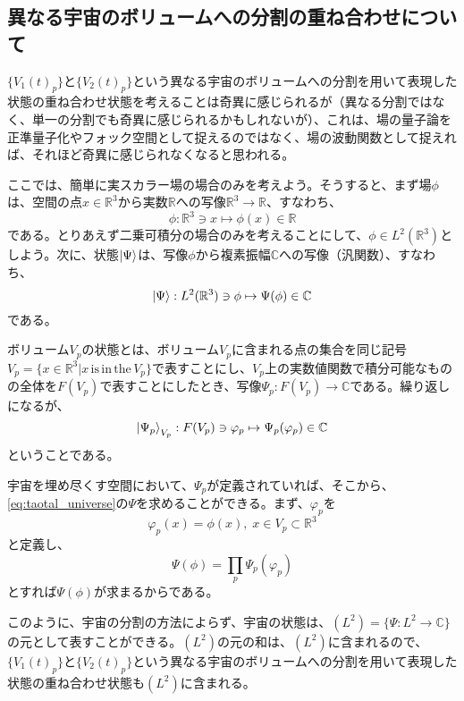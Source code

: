 \subsection{異なる宇宙のボリュームへの分割の重ね合わせについて}
$\{V_1(t)_p\}$と$\{V_2(t)_p\}$という異なる宇宙のボリュームへの分割を用いて表現した状態の重ね合わせ状態を考えることは奇異に感じられるが（異なる分割ではなく、単一の分割でも奇異に感じられるかもしれないが）、これは、場の量子論を正準量子化やフォック空間として捉えるのではなく、場の波動関数として捉えれば、それほど奇異に感じられなくなると思われる。\par
ここでは、簡単に実スカラー場の場合のみを考えよう。そうすると、まず場$\phi$は、空間の点$x \in \mathbb{R}^3$から実数$\mathbb{R}$への写像$\mathbb{R}^3 \to \mathbb{R}$、すなわち、
\begin{equation}
    \phi : \mathbb{R}^3 \ni x \mapsto \phi (x) \in \mathbb{R}
\end{equation}
である。とりあえず二乗可積分の場合のみを考えることにして、$\phi \in L^2(\mathbb{R}^3)$としよう。次に、状態$\ket{\Psi}$は、写像$\phi$から複素振幅$\mathbb{C}$への写像（汎関数）、すなわち、
\begin{equation}
    \label{eq:taotal_universe}
    \ket{\Psi} :  L^2(\mathbb{R}^3) \ni \phi \mapsto \Psi (\phi) \in \mathbb{C}
\end{equation}
である。\par
ボリューム$V_p$の状態とは、ボリューム$V_p$に含まれる点の集合を同じ記号$V_p=\{x \in \mathbb{R}^3 | x \mathrm{\, is\, in\, the\, }V_p\}$で表すことにし、$V_p$上の実数値関数で積分可能なものの全体を$F(V_p)$で表すことにしたとき、写像$\Psi_p : F(V_p) \to \mathbb{C}$である。繰り返しになるが、
\begin{equation}
    \ket{\Psi_p}_{V_p} :  F(V_p) \ni \varphi_p \mapsto \Psi_p (\varphi_p) \in \mathbb{C}
\end{equation}
ということである。\par
宇宙を埋め尽くす空間において、$\Psi_p$が定義されていれば、そこから、\eqref{eq:taotal_universe}の$\Psi$を求めることができる。まず、$\varphi_p$を
\begin{equation}
     \varphi_p(x) = \phi(x),\; x \in V_p \subset \mathbb{R}^3
\end{equation}
と定義し、
\begin{equation}
    \label{eq:universe_wavefunction}
    \Psi (\phi) = \prod_p \Psi_p(\varphi_p)
\end{equation}
とすれば$\Psi (\phi)$が求まるからである。\par
このように、宇宙の分割の方法によらず、宇宙の状態は、$(L^2) = \{\Psi : L^2 \to \mathbb{C}\}$の元として表すことができる。$(L^2)$の元の和は、$(L^2)$に含まれるので、$\{V_1(t)_p\}$と$\{V_2(t)_p\}$という異なる宇宙のボリュームへの分割を用いて表現した状態の重ね合わせ状態も$(L^2)$に含まれる。\par
